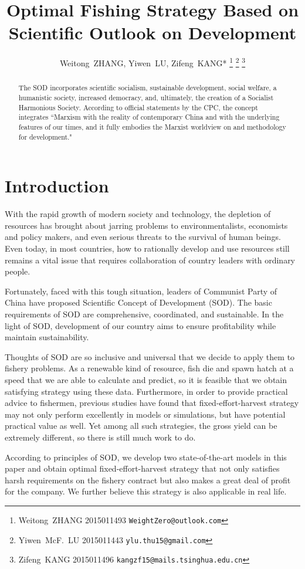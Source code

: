 \documentclass{IEEEtran}
\title{Optimal Fishing Strategy Based on Scientific Outlook on Development}
\author{
    Weitong~ZHANG, Yiwen~LU, Zifeng~KANG*
    \thanks{Weitong~ZHANG 2015011493  \texttt{WeightZero@outlook.com}}
    \thanks{Yiwen~McF.~LU 2015011443  \texttt{ylu.thu15@gmail.com}}
    \thanks{Zifeng~KANG 2015011496  \texttt{kangzf15@mails.tsinghua.edu.cn}}
}
\begin{document}
\maketitle

\begin{abstract}
    The SOD incorporates scientific socialism, sustainable development, social welfare, a humanistic society, increased democracy, and, ultimately, the creation of a Socialist Harmonious Society. According to official statements by the CPC, the concept integrates ``Marxism with the reality of contemporary China and with the underlying features of our times, and it fully embodies the Marxist worldview on and methodology for development."
\end{abstract}

\section{Introduction}

With the rapid growth of modern society and technology, the depletion of resources has brought about jarring problems to environmentalists, economists and policy makers, and even serious threats to the survival of human beings. Even today, in most countries, how to rationally develop and use resources still remains a vital issue that requires collaboration of country leaders with ordinary people.

Fortunately, faced with this tough situation, leaders of Communist Party of China have proposed Scientific Concept of Development (SOD). The basic requirements of SOD are comprehensive, coordinated, and sustainable. In the light of SOD, development of our country aims to ensure profitability while maintain sustainability.

Thoughts of SOD are so inclusive and universal that we decide to apply them to fishery problems. As a renewable kind of resource, fish die and spawn hatch at a speed that we are able to calculate and predict, so it is feasible that we obtain satisfying strategy using these data. Furthermore, in order to provide practical advice to fishermen, previous studies have found that fixed-effort-harvest strategy may not only perform excellently in models or simulations, but have potential practical value as well. Yet among all such strategies, the gross yield can be extremely different, so there is still much work to do. 

According to principles of SOD, we develop two state-of-the-art models in this paper and obtain optimal fixed-effort-harvest strategy that not only satisfies harsh requirements on the fishery contract but also makes a great deal of profit for the company. We further believe this strategy is also applicable in real life. 
\end{document}
